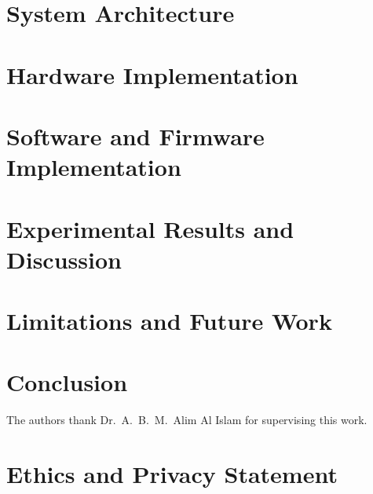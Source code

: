 \documentclass[sigconf,anonymous,review]{acmart}
\begin{document}
\section{System Architecture}
\label{sec:architecture}


\section{Hardware Implementation}
\label{sec:hardware}


\section{Software and Firmware Implementation}
\label{sec:firmware}


%

\section{Experimental Results and Discussion}
\label{sec:results}


\section{Limitations and Future Work}
\label{sec:limitations}


\section{Conclusion}


\ifblind\else
\begin{acks}
The authors thank Dr.\ A.\ B.\ M.\ Alim Al Islam for supervising this work.
\end{acks}
\fi

\section*{Ethics and Privacy Statement}




\end{document}
